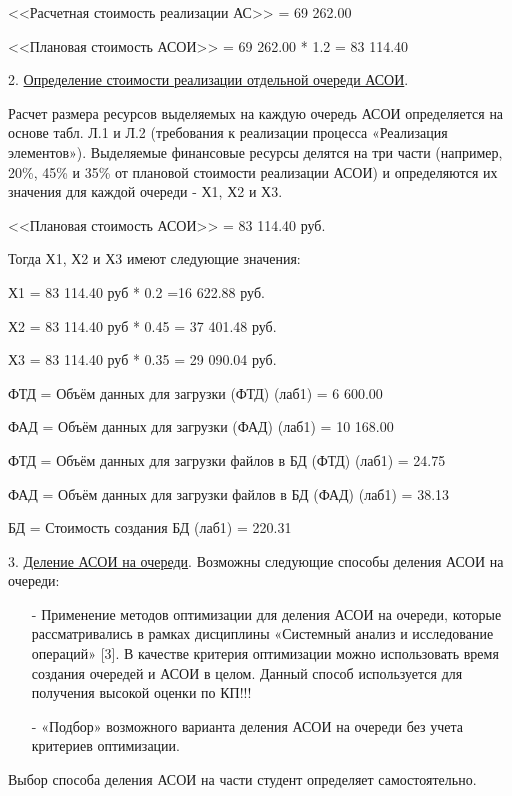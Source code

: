 \documentclass[12pt, a4paper, simple]{eskdtext}
\begin{document}
    <<Расчетная стоимость реализации АС>> = 69 262.00

    <<Плановая стоимость АСОИ>> = 69 262.00 * 1.2 = 83 114.40

    2. \underline{Определение стоимости реализации отдельной очереди АСОИ}.

    Расчет размера ресурсов выде­ляемых на каж­дую оче­редь АСОИ определяется на основе табл. Л.1 и Л.2
    (требования к реализации процесса «Реализация элементов»).
    Выделяемые финансовые ресурсы делятся на три части (на­пример, 20\%, 45\% и 35\% от плановой стоимо­сти реализации АСОИ)
    и опре­деля­ются их значе­ния для каждой очереди - Х1, Х2 и Х3.
    
    <<Плановая стоимость АСОИ>> = 83 114.40 руб.
    
    Тогда Х1, Х2 и Х3 имеют следующие значения:

    Х1 = 83 114.40 руб * 0.2 =16 622.88 руб.

    Х2 = 83 114.40 руб * 0.45 = 37 401.48 руб.
    
    Х3 = 83 114.40 руб * 0.35 = 29 090.04 руб.

    ФТД = Объём данных для загрузки (ФТД) (лаб1) = 6 600.00

    ФАД = Объём данных для загрузки (ФАД) (лаб1) = 10 168.00

    ФТД = Объём данных для загрузки файлов в БД (ФТД) (лаб1) = 24.75

    ФАД = Объём данных для загрузки файлов в БД (ФАД) (лаб1) = 38.13

    БД = Стоимость создания БД (лаб1) = 220.31

    3. \underline{Деление АСОИ на очереди}.
    Возможны следующие способы деления АСОИ на очереди:
    \begin{itemize}
        \item[-] Применение методов оптимизации для деления АСОИ на очереди,
        которые рассматрива­лись в рамках дисциплины «Системный анализ и исследование операций» [3].
        В качестве критерия оптимизации можно использовать время создания очередей и АСОИ в целом.
        Дан­ный способ используется для получения высокой оценки по КП!!!
        \item[-] «Подбор» возможного варианта деления АСОИ на очереди без учета критериев оптимиза­ции. 
    \end{itemize}

    Выбор способа деления АСОИ на части студент определяет самостоятельно.
\end{document}
